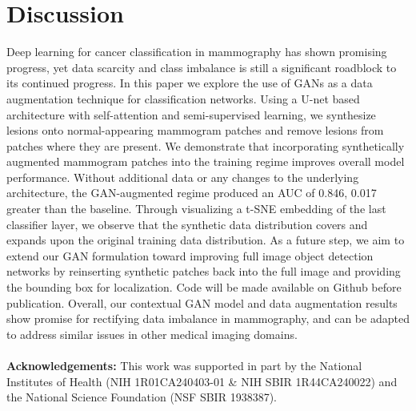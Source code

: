 \documentclass{article}
\begin{document}
\section{Discussion}
Deep learning for cancer classification in mammography has shown promising progress, yet data scarcity and class imbalance is still a significant roadblock to its continued progress. 
In this paper we explore the use of GANs as a data augmentation technique for classification networks. Using a U-net based architecture with self-attention and semi-supervised learning, we synthesize lesions onto normal-appearing mammogram patches and remove lesions from patches where they are present. 
We demonstrate that incorporating synthetically augmented mammogram patches into the training regime improves overall model performance. 
Without additional data or any changes to the underlying architecture, the GAN-augmented regime produced an AUC of 0.846, 0.017 greater than the baseline. Through visualizing a t-SNE embedding of the last classifier layer, we observe that the synthetic data distribution covers and expands upon the original training data distribution. 
As a future step, we aim to extend our GAN formulation toward improving full image object detection networks by reinserting synthetic patches back into the full image and providing the bounding box for localization. Code will be made available on Github before publication.
Overall, our contextual GAN model and data augmentation results show promise for rectifying data imbalance in mammography, and can be adapted to address similar issues in other medical imaging domains. \\
\\
\textbf{Acknowledgements:} This work was supported in part by the National Institutes of Health (NIH 1R01CA240403-01 \& NIH SBIR 1R44CA240022) and the National Science Foundation (NSF SBIR 1938387).
\end{document}
